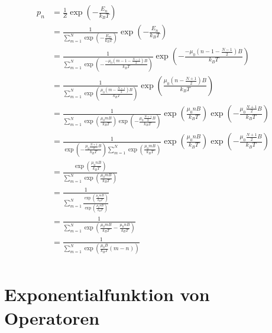 \documentclass[a4paper,11pt]{article}
\begin{document}
\begin{equation}
\begin{aligned}
p_n &= \frac{1}{Z} \exp \left( -\frac{E_n}{k_B T} \right) \\
    &= \frac{1}{\sum_{m=1}^N \exp \left( -\frac{E_m}{k_B T} \right)} \exp \left( -\frac{E_n}{k_B T} \right) \\
    &= \frac{1}{\sum_{m=1}^N \exp \left( -\frac{-\mu_0 \left( m-1-\frac{N-1}{2} \right) B }{k_B T} \right)} \exp \left( -\frac{-\mu_0 \left( n-1-\frac{N-1}{2} \right) B}{k_B T} \right) \\
    &= \frac{1}{\sum_{m=1}^N \exp \left( \frac{\mu_0 \left( m-\frac{N+1}{2} \right) B }{k_B T} \right)} \exp \left( \frac{\mu_0 \left( n-\frac{N+1}{2} \right) B}{k_B T} \right) \\
    &= \frac{1}{\sum_{m=1}^N \exp \left( \frac{\mu_0 m B }{k_B T} \right)\exp \left( -\frac{\mu_0 \frac{N+1}{2} B }{k_B T} \right)} \exp \left( \frac{\mu_0 n B }{k_B T} \right)\exp \left( -\frac{\mu_0 \frac{N+1}{2} B }{k_B T} \right) \\
    &= \frac{1}{\exp \left( -\frac{\mu_0 \frac{N+1}{2} B }{k_B T} \right)\sum_{m=1}^N \exp \left( \frac{\mu_0 m B }{k_B T} \right)} \exp \left( \frac{\mu_0 n B }{k_B T} \right)\exp \left( -\frac{\mu_0 \frac{N+1}{2} B }{k_B T} \right) \\
    &= \frac{\exp \left( \frac{\mu_0 n B }{k_B T} \right)}{\sum_{m=1}^N \exp \left( \frac{\mu_0 m B }{k_B T} \right)} \\
    &= \frac{1}{\sum_{m=1}^N \frac{ \exp \left( \frac{\mu_0 m B }{k_B T} \right)}{ \exp \left( \frac{\mu_0 n B }{k_B T} \right)} } \\
    &= \frac{1}{\sum_{m=1}^N \exp \left( \frac{\mu_0 m B }{k_B T} - \frac{\mu_0 n B }{k_B T} \right)} \\
    &= \frac{1}{\sum_{m=1}^N \exp \left( \frac{\mu_0 B }{k_B T} (m-n) \right)} \\
\end{aligned}
\end{equation}

\subsection{}

\subsection{}

\subsection{}

\section{Exponentialfunktion von Operatoren}

\subsection{}

\subsection{}

\subsection{}
\end{document}
